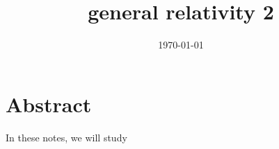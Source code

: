\documentclass[a4paper, 12pt]{memoir}
\title{general relativity 2}
\date{\today}
\begin{document}
\frontmatter



\tableofcontents

\mainmatter



\chapter*{Abstract}

    In these notes, we will study 
    




\backmatter

\clearpage
{}
\printbibliography
\end{document}
